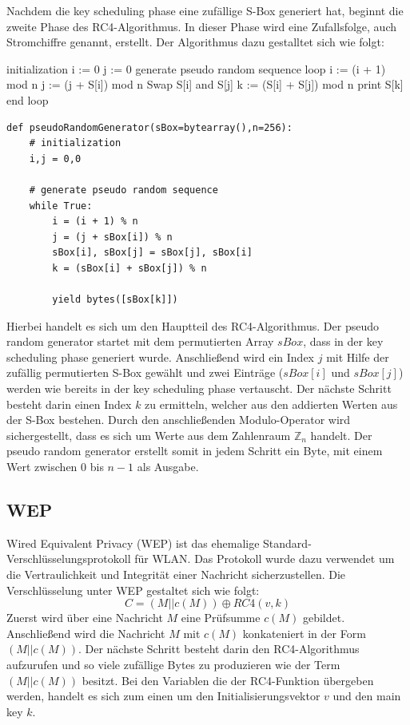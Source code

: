 \documentclass[10pt,a4paper]{article}
\begin{document}
Nachdem die key scheduling phase eine zufällige S-Box generiert hat, beginnt die zweite Phase des RC4-Algorithmus. In dieser Phase wird eine Zufallsfolge, auch Stromchiffre genannt, erstellt. Der Algorithmus dazu gestalltet sich wie folgt:
\begin{center}
\hspace{5pt}
\begin{minipage}[t]{.35\textwidth}
\begin{algorithm}
{initialization}
i := 0
j := 0
{generate pseudo random sequence}
loop
    i := (i + 1) mod n
    j := (j + S[i]) mod n
    Swap S[i] and S[j]
    k := (S[i] + S[j]) mod n
    print S[k]
end loop
\end{algorithm}
\end{minipage}\hspace{0.4cm}
\begin{minipage}[t]{.60\textwidth}
\begin{lstlisting}
def pseudoRandomGenerator(sBox=bytearray(),n=256):
   	# initialization
	i,j = 0,0

	# generate pseudo random sequence
	while True:
   		i = (i + 1) % n
   		j = (j + sBox[i]) % n
   		sBox[i], sBox[j] = sBox[j], sBox[i]
   		k = (sBox[i] + sBox[j]) % n

   		yield bytes([sBox[k]])
\end{lstlisting}
\end{minipage}
\end{center}
Hierbei handelt es sich um den Hauptteil des RC4-Algorithmus.  Der pseudo random generator startet mit dem permutierten Array $sBox$, dass in der key scheduling phase generiert wurde. Anschließend wird ein Index $j$ mit Hilfe der zufällig permutierten S-Box gewählt und zwei Einträge ($sBox[i]$ und $sBox[j]$) werden wie bereits in der key scheduling phase vertauscht. Der nächste Schritt besteht darin einen Index $k$ zu ermitteln, welcher aus den addierten Werten aus der S-Box bestehen. Durch den anschließenden Modulo-Operator wird sichergestellt, dass es sich um Werte aus dem Zahlenraum $\mathbb{Z}_n$ handelt. Der pseudo random generator erstellt somit in jedem Schritt ein Byte, mit einem Wert zwischen $0$ bis $n-1$ als Ausgabe.

\subsection{WEP}
Wired Equivalent Privacy (WEP) ist das ehemalige Standard-Verschlüsselungsprotokoll für WLAN. Das Protokoll wurde dazu verwendet um die Vertraulichkeit und Integrität einer Nachricht sicherzustellen. Die Verschlüsselung unter WEP gestaltet sich wie folgt:
$$
C = (M || c(M)) \oplus RC4(v,k)
$$
Zuerst wird über eine Nachricht $M$ eine Prüfsumme $c(M)$ gebildet. Anschließend wird die Nachricht $M$ mit $c(M)$ konkateniert in der Form $(M || c(M))$. Der nächste Schritt besteht darin den RC4-Algorithmus aufzurufen und so viele zufällige Bytes zu produzieren wie der Term $(M || c(M))$ besitzt. Bei den Variablen die der RC4-Funktion übergeben werden, handelt es sich zum einen um den Initialisierungsvektor $v$ und den main key $k$.
\end{document}
